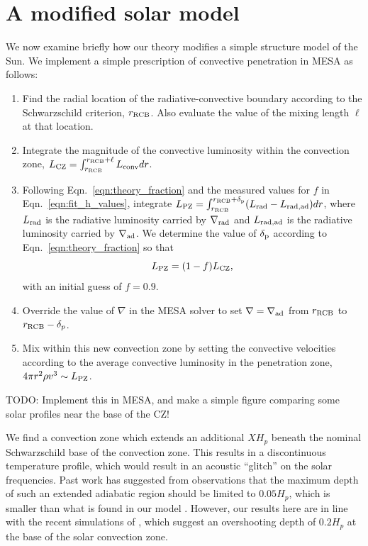 \documentclass{aastex631}
\newcommand{\gradrad}{\ensuremath{\nabla_{\rm{rad}}}}
\newcommand{\gradad}{\ensuremath{\nabla_{\rm{ad}}}}
\newcommand{\justgrad}{\ensuremath{\nabla}}
\newcommand{\delp}{\ensuremath{\delta_{\rm{p}}}}
\begin{document}
\section{A modified solar model}
\label{sec:solar_model}
We now examine briefly how our theory modifies a simple structure model of the Sun.
We implement a simple prescription of convective penetration in MESA \citep{paxton_etal_2013} as follows:
\begin{enumerate}
\item Find the radial location of the radiative-convective boundary according to the Schwarzschild criterion, $r_{\rm{RCB}}$.
Also evaluate the value of the mixing length $\ell$ at that location.
\item Integrate the magnitude of the convective luminosity within the convection zone, $L_{\rm{CZ}} = \int_{r_{\rm{RCB}}}^{r_{\rm{RCB}} + \ell} L_{\rm{conv}} dr$.
\item Following Eqn.~\ref{eqn:theory_fraction} and the measured values for $f$ in Eqn.~\ref{eqn:fit_h_values}, integrate $L_{\rm{PZ}} = \int_{r_{\rm{RCB}}}^{r_{\rm{RCB}} + \delp} (L_{\rm{rad}} - L_{\rm{rad,ad}}) dr$, where $L_{\rm{rad}}$ is the radiative luminosity carried by $\gradrad$ and $L_{\rm{rad,ad}}$ is the radiative luminosity carried by $\gradad$.
We determine the value of $\delp$ according to Eqn.~\ref{eqn:theory_fraction} so that
\begin{equation}
L_{\rm{PZ}} = (1 - f)L_{\rm{CZ}},
\label{eqn:mesa_equation}
\end{equation}
with an initial guess of $f = 0.9$.
\item Override the value of $\justgrad$ in the MESA solver to set $\justgrad = \gradad$ from $r_{\rm{RCB}}$ to $r_{\rm{RCB}} - \delta_p$.
\item Mix within this new convection zone by setting the convective velocities according to the average convective luminosity in the penetration zone, $4\pi r^2 \rho v^3 \sim L_{\rm{PZ}}$.
\end{enumerate}

TODO: Implement this in MESA, and make a simple figure comparing some solar profiles near the base of the CZ!

We find a convection zone which extends an additional $X H_p$ beneath the nominal Schwarzschild base of the convection zone.
This results in a discontinuous temperature profile, which would result in an acoustic ``glitch'' on the solar frequencies.
Past work has suggested from observations that the maximum depth of such an extended adiabatic region should be limited to $0.05 H_p$, which is smaller than what is found in our model \citep[see e.g., section 7.2.1 of][]{basu2016}.
However, our results here are in line with the recent simulations of \citet{kapyla2019}, which suggest an overshooting depth of $0.2 H_p$ at the base of the solar convection zone.
\end{document}
